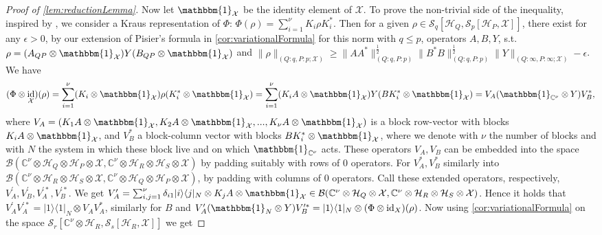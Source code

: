 \documentclass[11pt]{article}
\DeclareMathOperator{\id}{id}
\newcommand{\1}{\ensuremath{\mathbbm{1}}}
\theoremstyle{newdefinition}
\theoremstyle{newplain}
\theoremstyle{myplain}
\begin{document}
\begin{proof}[Proof of \cref{lem:reductionLemma}]
Now let $\1_\mathcal{X}$ be the identity element of $\mathcal{X}$.
To prove the non-trivial side of the inequality, inspired by \cite[Proof of Lemma 5]{Devetak.2006}, we consider a Kraus representation of $\Phi$: $\Phi(\rho)=\sum^\nu_{i=1}K_i \rho K_i^*$. Then for a given $\rho\in\mathcal{S}_q[\mathcal{H}_Q,\mathcal{S}_p[\mathcal{H}_P,\mathcal{X}]]$, there exist for any $\epsilon>0$, by our extension of Pisier's formula in \cref{cor:variationalFormula} for this norm with $q\leq p$, operators $A,B,Y$, s.t. $\rho=(A_{QP}\otimes\1_\mathcal{X})Y(B_{QP}\otimes \1_\mathcal{X})$ and $ \|\rho\|_{(Q:q,P:p;\mathcal{X})}\geq \|AA^*\|^{\frac{1}{2}}_{(Q:q,P:p)}\|B^*B\|^{\frac{1}{2}}_{(Q:q,P:p)}\|Y\|_{(Q:\infty,P:\infty;\mathcal{X})}-\epsilon$.
We have \begin{align}
    (\Phi\otimes\id_\mathcal{X})(\rho) = \sum_{i=1}^\nu(K_i\otimes\1_\mathcal{X})\rho(K_i^*\otimes\1_\mathcal{X})=\sum_{i=1}^\nu(K_iA\otimes\1_\mathcal{X})Y(BK_i^*\otimes\1_\mathcal{X}) = V_A(\1_{\mathbb{C}^\nu}\otimes Y)V^*_B,
\end{align} where $V_A= (K_1A\otimes\1_\mathcal{X},K_2A\otimes\1_\mathcal{X},...,K_\nu A\otimes\1_\mathcal{X})$ is a block row-vector with blocks $K_iA\otimes \1_\mathcal{X}$, and $V_B^*$ a block-column vector with blocks $BK_i^*\otimes\1_\mathcal{X}$, where we denote with $\nu$ the number of blocks and with $N$ the system in which these block live and on which $\1_{\mathbb{C}^\nu}$ acts.  
These operators $V_A, V_B$ can be embedded into the space $\mathcal{B}(\mathbb{C}^\nu\otimes\mathcal{H}_Q\otimes\mathcal{H}_P\otimes\mathcal{X},\mathbb{C}^\nu\otimes\mathcal{H}_R\otimes\mathcal{H}_S\otimes\mathcal{X})$ by padding suitably with rows of $0$ operators. For $V^*_A, V^*_B$ similarly into $\mathcal{B}(\mathbb{C}^\nu\otimes\mathcal{H}_R\otimes\mathcal{H}_S\otimes\mathcal{X},\mathbb{C}^\nu\otimes\mathcal{H}_Q\otimes\mathcal{H}_P\otimes\mathcal{X})$, by padding with columns of $0$ operators. Call these extended operators, respectively, $V_A^\prime, V_B^\prime, V_A^{\prime*} , V_B^{\prime*}$. We get $V^\prime_A=\sum^{\nu}_{i,j=1}\delta_{i1}|i\rangle\langle j|_N\otimes K_jA\otimes\1_\mathcal{X} \in \mathcal{B}(\mathbb{C}^\nu\otimes\mathcal{H}_Q\otimes\mathcal{X},\mathbb{C}^\nu\otimes\mathcal{H}_R\otimes\mathcal{H}_S\otimes\mathcal{X})$. 
Hence it holds that $V^\prime_AV_A^{\prime *}=|1\rangle\langle1|_N\otimes V_AV_A^*$, similarly for $B$ and $V^\prime_A(\1_N\otimes Y)V_B^{\prime *}=|1\rangle\langle 1|_N\otimes (\Phi\otimes\id_X)(\rho)$. 
Now using \cref{cor:variationalFormula} on the space $\mathcal{S}_r[\mathbb{C}^\nu\otimes\mathcal{H}_R,\mathcal{S}_s[\mathcal{H}_R,\mathcal{X}]]$ we get

\end{proof}
\end{document}
